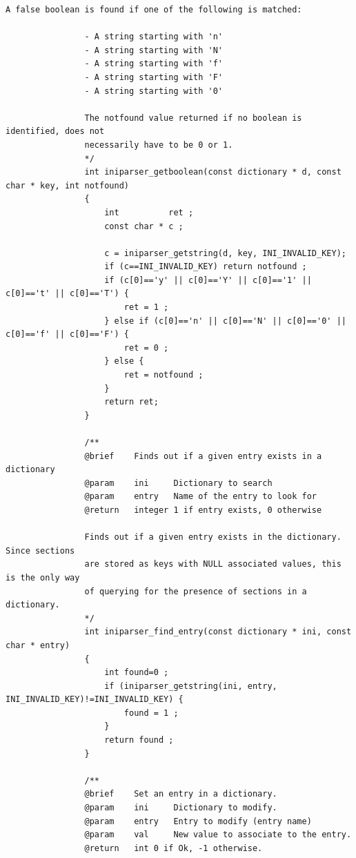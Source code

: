 \documentclass{article}
\begin{document}
\begin{Verbatim}[gobble=8]
                A false boolean is found if one of the following is matched:
                
                - A string starting with 'n'
                - A string starting with 'N'
                - A string starting with 'f'
                - A string starting with 'F'
                - A string starting with '0'
                
                The notfound value returned if no boolean is identified, does not
                necessarily have to be 0 or 1.
                */
                int iniparser_getboolean(const dictionary * d, const char * key, int notfound)
                {
                    int          ret ;
                    const char * c ;
                
                    c = iniparser_getstring(d, key, INI_INVALID_KEY);
                    if (c==INI_INVALID_KEY) return notfound ;
                    if (c[0]=='y' || c[0]=='Y' || c[0]=='1' || c[0]=='t' || c[0]=='T') {
                        ret = 1 ;
                    } else if (c[0]=='n' || c[0]=='N' || c[0]=='0' || c[0]=='f' || c[0]=='F') {
                        ret = 0 ;
                    } else {
                        ret = notfound ;
                    }
                    return ret;
                }
                
                /**
                @brief    Finds out if a given entry exists in a dictionary
                @param    ini     Dictionary to search
                @param    entry   Name of the entry to look for
                @return   integer 1 if entry exists, 0 otherwise
                
                Finds out if a given entry exists in the dictionary. Since sections
                are stored as keys with NULL associated values, this is the only way
                of querying for the presence of sections in a dictionary.
                */
                int iniparser_find_entry(const dictionary * ini, const char * entry)
                {
                    int found=0 ;
                    if (iniparser_getstring(ini, entry, INI_INVALID_KEY)!=INI_INVALID_KEY) {
                        found = 1 ;
                    }
                    return found ;
                }
                
                /**
                @brief    Set an entry in a dictionary.
                @param    ini     Dictionary to modify.
                @param    entry   Entry to modify (entry name)
                @param    val     New value to associate to the entry.
                @return   int 0 if Ok, -1 otherwise.
                

\end{Verbatim}
\end{document}
